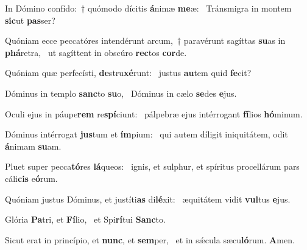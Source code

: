 \item In Dómino confído:~† quómodo dícitis \textbf{á}nimæ \textbf{me}æ:~\psstar{} Tránsmigra in montem \textbf{sic}ut \textbf{pas}ser?
\item Quóniam ecce peccatóres intendérunt arcum,~† paravérunt sagíttas \textbf{su}as in \textbf{phá}retra,~\psstar{} ut sagíttent in obscúro \textbf{rec}tos \textbf{cor}de.
\item Quóniam quæ perfecísti, \textbf{de}stru\textbf{xé}runt:~\psstar{} justus \textbf{au}tem quid \textbf{fe}cit?
\item Dóminus in templo \textbf{sanc}to \textbf{su}o,~\psstar{} Dóminus in cælo \textbf{se}des \textbf{e}jus.
\item Oculi ejus in páupe\textbf{rem} re\textbf{spí}ciunt:~\psstar{} pálpebræ ejus intérrogant \textbf{fí}lios \textbf{hó}minum.
\item Dóminus intérrogat \textbf{jus}tum et \textbf{ím}pium:~\psstar{} qui autem díligit iniquitátem, odit \textbf{á}nimam \textbf{su}am.
\item Pluet super pecca\textbf{tó}res \textbf{lá}queos:~\psstar{} ignis, et sulphur, et spíritus procellárum pars cáli\textbf{cis} e\textbf{ó}rum.
\item Quóniam justus Dóminus, et justíti\textbf{as} di\textbf{lé}xit:~\psstar{} æquitátem vidit \textbf{vul}tus \textbf{e}jus.
\item Glória \textbf{Pa}tri, et \textbf{Fí}lio,~\psstar{} et Spi\textbf{rí}tui \textbf{Sanc}to.
\item Sicut erat in princípio, et \textbf{nunc}, et \textbf{sem}per,~\psstar{} et in sǽcula sæcu\textbf{ló}rum. \textbf{A}men.
